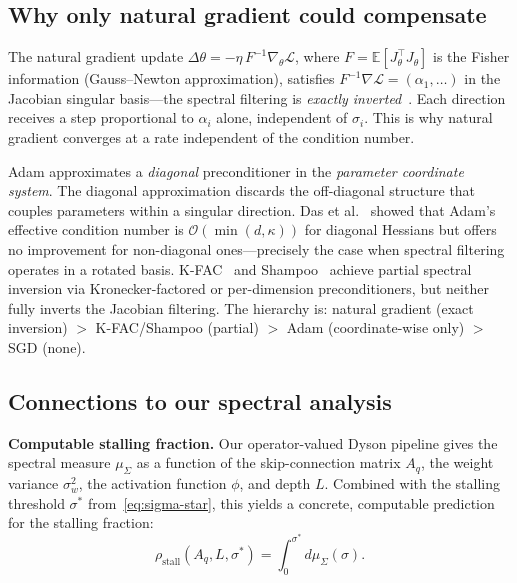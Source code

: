 \subsection{Why only natural gradient could compensate}\label{app:natural-gradient}

The natural gradient update $\Delta\theta = -\eta\, F^{-1}\nabla_\theta\mathcal{L}$, where $F = \mathbb{E}[J_\theta^\top J_\theta]$ is the Fisher information (Gauss--Newton approximation), satisfies $F^{-1}\nabla\mathcal{L} = (\alpha_1, \ldots)$ in the Jacobian singular basis---the spectral filtering is \emph{exactly inverted}~\cite{amari1998natural}. Each direction receives a step proportional to $\alpha_i$ alone, independent of $\sigma_i$. This is why natural gradient converges at a rate independent of the condition number.

Adam approximates a \emph{diagonal} preconditioner in the \emph{parameter coordinate system}. The diagonal approximation discards the off-diagonal structure that couples parameters within a singular direction. Das et al.~\cite{das2024preconditioning} showed that Adam's effective condition number is $\mathcal{O}(\min(d, \kappa))$ for diagonal Hessians but offers no improvement for non-diagonal ones---precisely the case when spectral filtering operates in a rotated basis. K-FAC~\cite{martens2015kfac} and Shampoo~\cite{gupta2018shampoo} achieve partial spectral inversion via Kronecker-factored or per-dimension preconditioners, but neither fully inverts the Jacobian filtering. The hierarchy is: natural gradient (exact inversion) $>$ K-FAC/Shampoo (partial) $>$ Adam (coordinate-wise only) $>$ SGD (none).

\subsection{Connections to our spectral analysis}\label{app:stalling-connections}

\noindent\textbf{Computable stalling fraction.}
Our operator-valued Dyson pipeline gives the spectral measure $\mu_\Sigma$ as a function of the skip-connection matrix $A_q$, the weight variance $\sigma_w^2$, the activation function $\phi$, and depth $L$. Combined with the stalling threshold $\sigma^*$ from~\eqref{eq:sigma-star}, this yields a concrete, computable prediction for the stalling fraction:
\begin{equation}\label{eq:stalling-fraction}
\rho_{\mathrm{stall}}(A_q, L, \sigma^*) = \int_0^{\sigma^*} d\mu_\Sigma(\sigma).
\end{equation}

